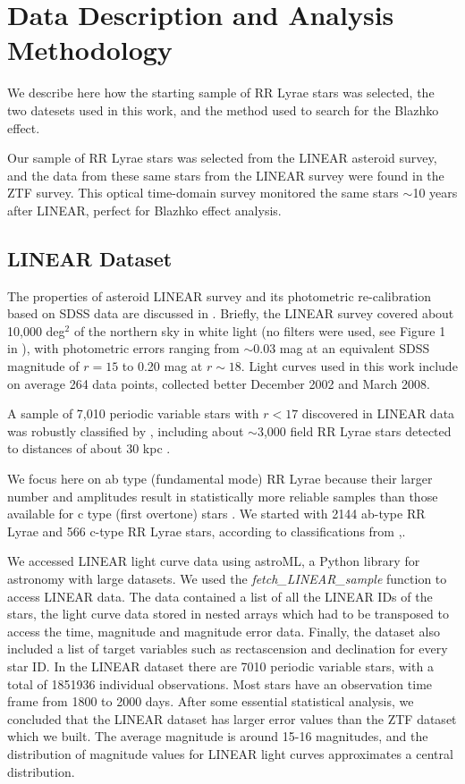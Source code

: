 

\section{Data Description and Analysis Methodology\label{sec:analysis}}

We describe here how the starting sample of RR Lyrae stars was selected, the two datesets used in this work,
and the method used to search for the Blazhko effect.

Our sample of RR Lyrae stars was selected from the LINEAR asteroid survey, and the data from these same stars from the LINEAR survey were found
in the ZTF survey. This optical time-domain survey monitored the same stars $\sim$10 years after LINEAR, perfect for Blazhko effect analysis. 


\subsection{LINEAR Dataset}

The properties of asteroid LINEAR survey and its photometric re-calibration based on SDSS data are discussed in \cite{2011AJ....142..190S}.
Briefly, the LINEAR survey covered about 10,000 deg$^2$ of the northern sky in white light (no filters were used, see Figure 1 in \citealt{2011AJ....142..190S}),
with photometric errors ranging from $\sim$0.03 mag at an equivalent SDSS magnitude of $r=15$ to 0.20 mag at $r\sim18$. Light curves used
in this work include on average 264 data points, collected better December 2002 and March 2008.
 
A sample of 7,010 periodic variable stars with $r<17$ discovered in LINEAR data was robustly classified by \cite{2013AJ....146..101P}, including
about $\sim$3,000 field RR Lyrae stars detected to distances of about 30 kpc \citep{2013AJ....146...21S}. 

We focus here on ab type (fundamental mode) RR Lyrae because their larger number and amplitudes result in statistically
more reliable samples than those available for c type (first overtone) stars \cite{2016CoKon.105...61K}.
We started with 2144 ab-type RR Lyrae  and 566 c-type RR Lyrae stars, according to classifications from \cite{2013AJ....146..101P},. 

We accessed LINEAR light curve data using astroML, a Python library for astronomy with large datasets. We used the {\it fetch_LINEAR_sample} function to access LINEAR data. The data contained a list of all the 
LINEAR IDs of the stars, the light curve data stored in nested arrays which had to be transposed to access the time, magnitude and magnitude error data. Finally, the dataset also included
a list of target variables such as rectascension and declination for every star ID.
In the LINEAR dataset there are 7010 periodic variable stars, with a total of 1851936 individual observations. 
Most stars have an observation time frame from 1800 to 2000 days. After some essential statistical analysis, we concluded that the LINEAR dataset has larger error values than the ZTF dataset which we built. 
The average magnitude is around 15-16 magnitudes, and the distribution of magnitude values for LINEAR light curves approximates a central distribution.


